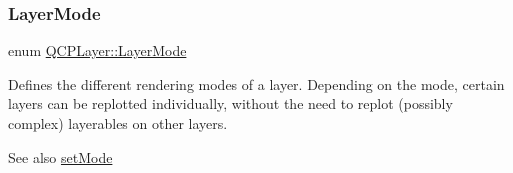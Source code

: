 \subsubsection{\texorpdfstring{Layer\+Mode}{LayerMode}\hspace{0.1cm}{\footnotesize\ttfamily [2/2]}}
{\footnotesize\ttfamily enum \hyperlink{class_q_c_p_layer_a67dcfc1590be2a1f2227c5a39bb59c7c}{Q\+C\+P\+Layer\+::\+Layer\+Mode}}

Defines the different rendering modes of a layer. Depending on the mode, certain layers can be replotted individually, without the need to replot (possibly complex) layerables on other layers.

\begin{DoxySeeAlso}{See also}
\hyperlink{class_q_c_p_layer_a938d57b04f4e4c23cedf1711f983919b}{set\+Mode} 
\end{DoxySeeAlso}
